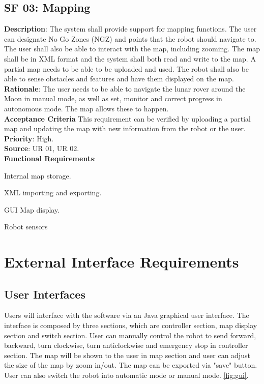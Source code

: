 \documentclass[12pt,a4paper]{article}
\renewenvironment{enumerate}[1]{\begin{compactenum}#1}{\end{compactenum}}
\begin{document}
	\subsection{SF 03: Mapping}
    \textbf{Description}: The system shall provide support for mapping functions. The user can designate No Go Zones (NGZ) and points that the robot should navigate to. The user shall also be able to interact with the map, including zooming. The map shall be in XML format and the system shall both read and write to the map. A partial map needs to be able to be uploaded and used. The robot shall also be able to sense obstacles and features and have them displayed on the map.\\
	\textbf{Rationale}: The user needs to be able to navigate the lunar rover around the Moon in manual mode, as well as set, monitor and correct progress in autonomous mode. The map allows these to happen.\\
    \textbf{Acceptance Criteria} This requirement can be verified by uploading a partial map and updating the map with new information from the robot or the user.\\
    \textbf{Priority}: High.\\
    \textbf{Source}: UR 01, UR 02.\\
    \textbf{Functional Requirements}: 
    \begin{enumerate}
    \item Internal map storage.
    \item XML importing and exporting.
    \item GUI Map display.
    \item Robot sensors
    \end {enumerate}
    
    \newpage
    
	\section{External Interface Requirements}
	\subsection{User Interfaces}
	Users will interface with the software via an Java graphical user interface. The interface is composed by three sections, which are controller section, map display section and switch section. User can manually control the robot to send forward, backward, turn clockwise, turn anticlockwise and emergency stop in controller section. The map will be shown to the user in map section and user can adjust the size of the map by zoom in/out. The map can be exported via "save" button. User can also switch the robot into automatic mode or manual mode. \ref{fig:gui}.
\end{document}

